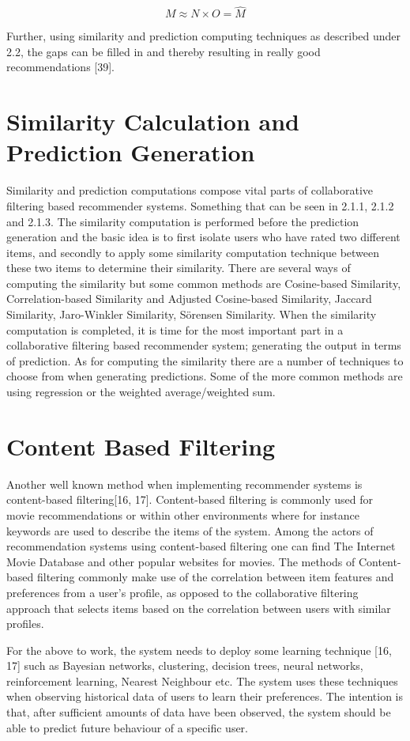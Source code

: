 \[ M \approx N \times O = \hat{M} \]

Further, using similarity and prediction computing techniques as described under 2.2, the gaps can be filled in and thereby resulting in really good recommendations [39].

\section{Similarity Calculation and Prediction Generation}
Similarity and prediction computations compose vital parts of collaborative filtering based recommender systems. Something that can be seen in 2.1.1, 2.1.2 and 2.1.3. The similarity computation is performed before the prediction generation and the basic idea is to first isolate users who have rated two different items, and secondly to apply some similarity computation technique between these two items to determine their similarity. There are several ways of computing the similarity but some common methods are Cosine-based Similarity, Correlation-based Similarity and Adjusted Cosine-based Similarity, Jaccard Similarity, Jaro-Winkler Similarity, Sörensen Similarity.
When the similarity computation is completed, it is time for the most important part in a collaborative filtering based recommender system; generating the output in terms of prediction. As for computing the similarity there are a number of techniques to choose from when generating predictions. Some of the more common methods are using regression or the weighted average/weighted sum.

\section{Content Based Filtering}\label{contentfiltering}
Another well known method when implementing recommender systems is content-based filtering[16, 17]. Content-based filtering is commonly used for movie recommendations or within other environments where for instance keywords are used to describe the items of the system. Among the actors of recommendation systems using content-based filtering one can find The Internet Movie Database and other popular websites for movies. The methods of Content-based filtering commonly make use of the correlation between item features and preferences from a user’s profile, as opposed to the collaborative filtering approach that selects items based on the correlation between users with similar profiles. 

For the above to work, the system needs to deploy some learning technique [16, 17] such as Bayesian networks, clustering, decision trees, neural networks, reinforcement learning, Nearest Neighbour etc. The system uses these techniques when observing historical data of users to learn their preferences. The intention is that, after sufficient amounts of data have been observed, the system should be able to predict future behaviour of a specific user.


